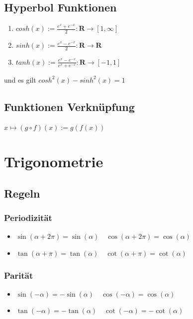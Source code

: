 \documentclass[8pt]{extarticle}
\begin{document}
\begin{multicols*}{3}
\subsection{Hyperbol Funktionen}

\begin{enumerate}
  \item $cosh(x) := \frac{e^x + e^{-x}}{2}: \mathbf{R} \rightarrow [1, \infty]$
  \item $sinh(x) := \frac{e^x - e^{-x}}{2}: \mathbf{R} \rightarrow \mathbf{R}$
  \item $tanh(x) := \frac{e^x - e^{-x}}{e^x + e^{-x}}: \mathbf{R} \rightarrow [-1, 1]$
\end{enumerate}
und es gilt $cosh^2(x) - sinh^2(x) = 1$



\subsection{Funktionen Verknüpfung}

$
x \mapsto (g \circ f)(x) := g(f(x))
$
%



\section{Trigonometrie}

\subsection{Regeln}
\subsubsection{Periodizität}
\begin{itemize}
 \item $\sin(\alpha + 2 \pi) = \sin(\alpha) \quad \cos(\alpha + 2 \pi) = \cos(\alpha)$
 \item $\tan(\alpha + \pi) = \tan(\alpha) \quad \cot(\alpha + \pi) = \cot(\alpha)$
\end{itemize}

\subsubsection{Parität}
\begin{itemize}
 \item $\sin(-\alpha) = - \sin(\alpha) \quad \cos(-\alpha) = \cos(\alpha)$
 \item $\tan(-\alpha) = - \tan(\alpha) \quad \cot(-\alpha) = - \cot(\alpha)$
\end{itemize}


\end{multicols*}
\end{document}

